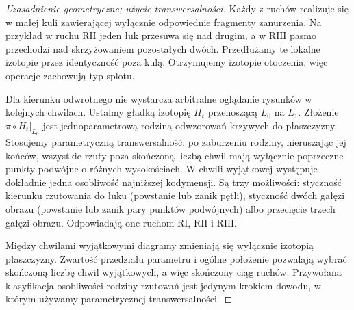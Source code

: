 \begin{proof}[Uzasadnienie geometryczne; użycie transwersalności]
Każdy z ruchów realizuje się w małej kuli zawierającej wyłącznie
odpowiednie fragmenty zanurzenia. Na przykład w ruchu $\mathrm{R II}$
jeden łuk przesuwa się nad drugim, a w $\mathrm{R III}$ pasmo
przechodzi nad skrzyżowaniem pozostałych dwóch. Przedłużamy
te lokalne izotopie przez identyczność poza kulą. Otrzymujemy
izotopie otoczenia, więc operacje zachowują typ splotu.

Dla kierunku odwrotnego nie wystarcza arbitralne oglądanie
rysunków w kolejnych chwilach. Ustalmy gładką izotopię
$H_t$ przenoszącą $L_0$ na $L_1$. Złożenie
$\pi\circ H_t|_{L_0}$ jest jednoparametrową rodziną
odwzorowań krzywych do płaszczyzny. Stosujemy parametryczną
transwersalność: po zaburzeniu rodziny, nieruszając jej
końców, wszystkie rzuty poza skończoną liczbą chwil mają
wyłącznie poprzeczne punkty podwójne o różnych wysokościach.
W chwili wyjątkowej występuje dokładnie jedna osobliwość
najniższej kodymensji. Są trzy możliwości: styczność kierunku
rzutowania do łuku (powstanie lub zanik pętli), styczność
dwóch gałęzi obrazu (powstanie lub zanik pary punktów
podwójnych) albo przecięcie trzech gałęzi obrazu. Odpowiadają
one ruchom $\mathrm{R I}$, $\mathrm{R II}$ i $\mathrm{R III}$.

Między chwilami wyjątkowymi diagramy zmieniają się wyłącznie
izotopią płaszczyzny. Zwartość przedziału parametru i ogólne
położenie pozwalają wybrać skończoną liczbę chwil wyjątkowych,
a więc skończony ciąg ruchów. Przywołana klasyfikacja
osobliwości rodziny rzutowań jest jedynym krokiem dowodu,
w którym używamy parametrycznej transwersalności.
\end{proof}


\begin{center}
\end{center}


